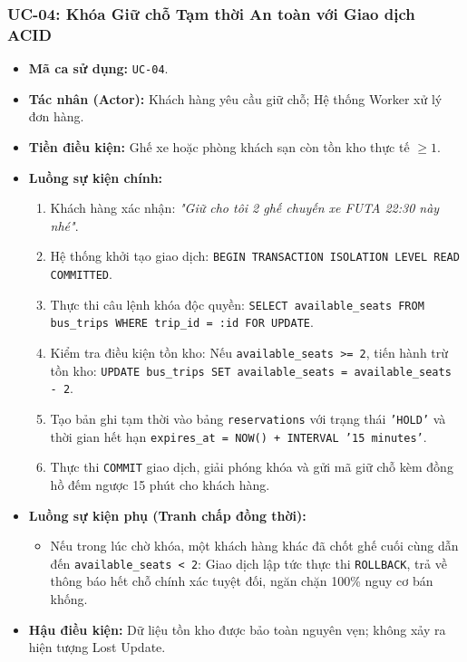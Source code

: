 \subsubsection{UC-04: Khóa Giữ chỗ Tạm thời An toàn với Giao dịch ACID}
\begin{itemize}
    \item \textbf{Mã ca sử dụng:} \texttt{UC-04}.
    \item \textbf{Tác nhân (Actor):} Khách hàng yêu cầu giữ chỗ; Hệ thống Worker xử lý đơn hàng.
    \item \textbf{Tiền điều kiện:} Ghế xe hoặc phòng khách sạn còn tồn kho thực tế $\ge 1$.
    \item \textbf{Luồng sự kiện chính:}
    \begin{enumerate}
        \item Khách hàng xác nhận: \textit{"Giữ cho tôi 2 ghế chuyến xe FUTA 22:30 này nhé"}.
        \item Hệ thống khởi tạo giao dịch: \texttt{BEGIN TRANSACTION ISOLATION LEVEL READ COMMITTED}.
        \item Thực thi câu lệnh khóa độc quyền: \texttt{SELECT available\_seats FROM bus\_trips WHERE trip\_id = :id FOR UPDATE}.
        \item Kiểm tra điều kiện tồn kho: Nếu \texttt{available\_seats >= 2}, tiến hành trừ tồn kho: \texttt{UPDATE bus\_trips SET available\_seats = available\_seats - 2}.
        \item Tạo bản ghi tạm thời vào bảng \texttt{reservations} với trạng thái \texttt{'HOLD'} và thời gian hết hạn \texttt{expires\_at = NOW() + INTERVAL '15 minutes'}.
        \item Thực thi \texttt{COMMIT} giao dịch, giải phóng khóa và gửi mã giữ chỗ kèm đồng hồ đếm ngược 15 phút cho khách hàng.
    \end{enumerate}
    \item \textbf{Luồng sự kiện phụ (Tranh chấp đồng thời):}
    \begin{itemize}
        \item Nếu trong lúc chờ khóa, một khách hàng khác đã chốt ghế cuối cùng dẫn đến \texttt{available\_seats < 2}: Giao dịch lập tức thực thi \texttt{ROLLBACK}, trả về thông báo hết chỗ chính xác tuyệt đối, ngăn chặn 100\% nguy cơ bán khống.
    \end{itemize}
    \item \textbf{Hậu điều kiện:} Dữ liệu tồn kho được bảo toàn nguyên vẹn; không xảy ra hiện tượng Lost Update.
\end{itemize}
